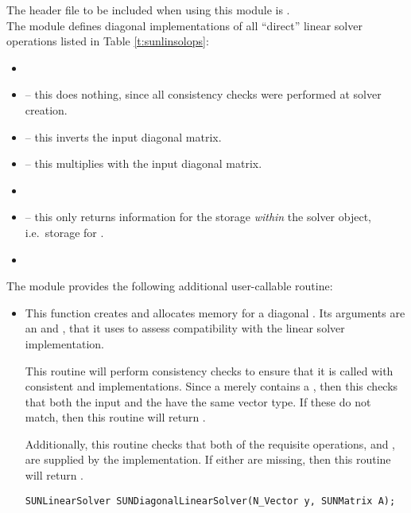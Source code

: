 \noindent The header file to be included when using this module 
is . \\
The {\sunlinsoldiag} module defines diagonal implementations of all
``direct'' linear solver operations listed in Table \ref{t:sunlinsolops}:
\begin{itemize}
\item {}
\item {} -- this does nothing, since all
  consistency checks were performed at solver creation.
\item {} -- this inverts the input diagonal
  matrix.
\item {} -- this multiplies with the input
  diagonal matrix.
\item {}
\item {} -- this only returns information for
  the storage \emph{within} the solver object, i.e.~storage
  for .
\item {}
\end{itemize}
The module {\sunlinsoldiag} provides the following additional
user-callable routine: 
\begin{itemize}


\item {}

  This function creates and allocates memory for a diagonal
  .  Its arguments are an {\nvector} and
  {\sunmatrix}, that it uses to assess compatibility with the linear
  solver implementation.

  This routine will perform consistency checks to ensure that it is
  called with consistent {\nvector} and {\sunmatrix} implementations.
  Since a {\sunmatdiag} merely contains a {\nvector}, then this checks
  that both the input {\nvector} and the {\sunmatdiag} {\nvector}
  have the same vector type.  If these do not match, then this routine
  will return .

  Additionally, this routine checks that both of the requisite
  {\nvector} operations,  and , are
  supplied by the {\nvector} implementation.  If either are missing,
  then this routine will return .

  \verb|SUNLinearSolver SUNDiagonalLinearSolver(N_Vector y, SUNMatrix A);|

\end{itemize}
